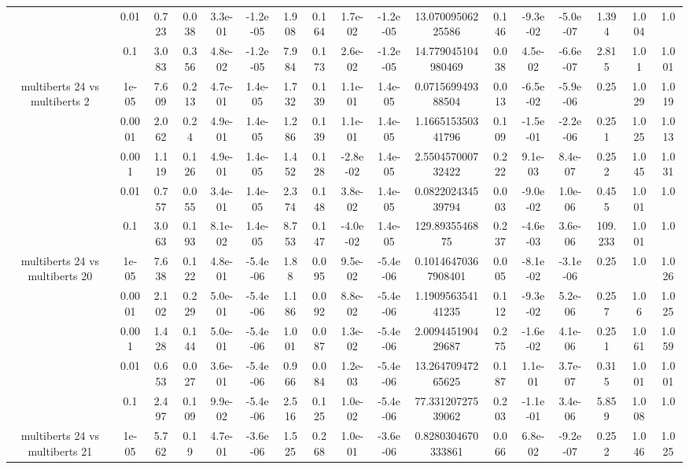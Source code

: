 \begin{tabular}{|c|c|c|c|c|c|c|c|c|c|c|c|c|c|c|c|c|}
 & 0.01 & 0.723 & 0.038 & 3.3e-01 & -1.2e-05 & 1.908 & 0.164 & 1.7e-02 & -1.2e-05 & 13.07009506225586 & 0.146 & -9.3e-02 & -5.0e-07 & 1.394 & 1.004 & 1.0 \\
 & 0.1 & 3.083 & 0.356 & 4.8e-02 & -1.2e-05 & 7.984 & 0.173 & 2.6e-02 & -1.2e-05 & 14.779045104980469 & 0.038 & 4.5e-02 & -6.6e-07 & 2.815 & 1.01 & 1.001 \\
\hline
\multirow{5}{*}{multiberts 24 vs multiberts 2} & 1e-05 & 7.609 & 0.213 & 4.7e-01 & 1.4e-05 & 1.732 & 0.139 & 1.1e-01 & 1.4e-05 & 0.071569949388504 & 0.013 & -6.5e-02 & -5.9e-06 & 0.25 & 1.029 & 1.019 \\
 & 0.0001 & 2.062 & 0.24 & 4.9e-01 & 1.4e-05 & 1.286 & 0.139 & 1.1e-01 & 1.4e-05 & 1.166515350341796 & 0.109 & -1.5e-01 & -2.2e-06 & 0.251 & 1.025 & 1.013 \\
 & 0.001 & 1.119 & 0.126 & 4.9e-01 & 1.4e-05 & 1.452 & 0.128 & -2.8e-02 & 1.4e-05 & 2.550457000732422 & 0.222 & 9.1e-03 & 8.4e-07 & 0.252 & 1.045 & 1.031 \\
 & 0.01 & 0.757 & 0.055 & 3.4e-01 & 1.4e-05 & 2.374 & 0.148 & 3.8e-02 & 1.4e-05 & 0.082202434539794 & 0.003 & -9.0e-02 & 1.0e-06 & 0.455 & 1.001 & 1.0 \\
 & 0.1 & 3.063 & 0.193 & 8.1e-02 & 1.4e-05 & 8.753 & 0.147 & -4.0e-02 & 1.4e-05 & 129.8935546875 & 0.237 & -4.6e-03 & 3.6e-06 & 109.233 & 1.001 & 1.0 \\
\hline
\multirow{5}{*}{multiberts 24 vs multiberts 20} & 1e-05 & 7.638 & 0.122 & 4.8e-01 & -5.4e-06 & 1.88 & 0.095 & 9.5e-02 & -5.4e-06 & 0.10146470367908401 & 0.005 & -8.1e-02 & -3.1e-06 & 0.25 & 1.0 & 1.026 \\
 & 0.0001 & 2.102 & 0.229 & 5.0e-01 & -5.4e-06 & 1.186 & 0.092 & 8.8e-02 & -5.4e-06 & 1.190956354141235 & 0.112 & -9.3e-02 & 5.2e-06 & 0.257 & 1.06 & 1.025 \\
 & 0.001 & 1.428 & 0.144 & 5.0e-01 & -5.4e-06 & 1.001 & 0.087 & 1.3e-02 & -5.4e-06 & 2.009445190429687 & 0.275 & -1.6e-02 & 4.1e-06 & 0.251 & 1.061 & 1.059 \\
 & 0.01 & 0.653 & 0.027 & 3.6e-01 & -5.4e-06 & 0.966 & 0.084 & 1.2e-03 & -5.4e-06 & 13.26470947265625 & 0.187 & 1.1e-01 & 3.7e-07 & 0.315 & 1.001 & 1.001 \\
 & 0.1 & 2.497 & 0.109 & 9.9e-02 & -5.4e-06 & 2.516 & 0.125 & 1.0e-02 & -5.4e-06 & 77.33120727539062 & 0.203 & -1.1e-01 & 3.4e-06 & 5.859 & 1.008 & 1.0 \\
\hline
\multirow{5}{*}{multiberts 24 vs multiberts 21} & 1e-05 & 5.762 & 0.19 & 4.7e-01 & -3.6e-06 & 1.525 & 0.268 & 1.0e-01 & -3.6e-06 & 0.8280304670333861 & 0.066 & 6.8e-02 & -9.2e-07 & 0.252 & 1.046 & 1.025 \\

\end{tabular}
